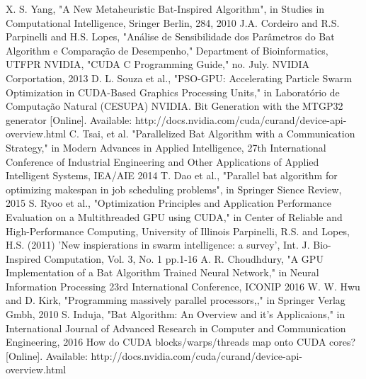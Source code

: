 \documentclass[conference]{IEEEtran}
\begin{document}
\begin{thebibliography}{1} %
    X. S. Yang, "A New Metaheuristic Bat-Inspired Algorithm", in Studies in Computational Intelligence, Sringer Berlin, 284, 2010
    J.A. Cordeiro and R.S. Parpinelli and H.S. Lopes, "Análise de Sensibilidade dos Parâmetros do Bat Algorithm e Comparação de Desempenho," Department of Bioinformatics, UTFPR
    NVIDIA, "CUDA C Programming Guide," no. July. NVIDIA Corportation, 2013
    D. L. Souza et al., "PSO-GPU: Accelerating Particle Swarm Optimization in CUDA-Based
    Graphics Processing Units," in Laboratório de Computação Natural
    (CESUPA)
    NVIDIA.  Bit Generation with the MTGP32 generator [Online]. Available: http://docs.nvidia.com/cuda/curand/device-api-overview.html
    C. Tsai, et al. "Parallelized Bat Algorithm with a Communication Strategy," in Modern Advances in Applied Intelligence, 27th International Conference of Industrial Engineering and Other Applications of Applied Intelligent Systems, IEA/AIE 2014
    T. Dao et al.,  "Parallel bat algorithm for optimizing makespan in job scheduling problems", in Springer Sience Review, 2015
    S. Ryoo et al.,  "Optimization Principles and Application Performance Evaluation on a Multithreaded GPU using CUDA," in Center of Reliable and High-Performance Computing, University of Illinois
    Parpinelli, R.S. and Lopes, H.S. (2011) 'New inspierations in swarm intelligence: a survey', Int. J. Bio-Inspired Computation, Vol. 3, No. 1 pp.1-16
    A. R. Choudhdury, "A GPU Implementation of a Bat Algorithm Trained Neural Network," in Neural Information Processing 23rd International Conference, ICONIP 2016
    W. W. Hwu and D. Kirk, "Programming massively parallel processors,," in Springer Verlag Gmbh, 2010
    S. Induja, "Bat Algorithm: An Overview and it's Applicaions,"
    in International Journal of Advanced Research in Computer and Communication Engineering, 2016
    How do CUDA blocks/warps/threads map onto CUDA cores? [Online]. Available: http://docs.nvidia.com/cuda/curand/device-api-overview.html

\end{thebibliography}
\end{document}
